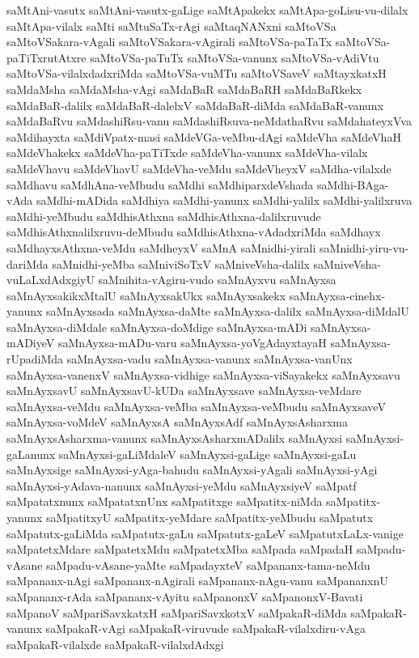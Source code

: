 {saMtAni-vasutx
saMtAni-vasutx-gaLige
saMtApakekx
saMtApa-goLisu-vu-dilalx
saMtApa-vilalx
saMti
saMtuSaTx-rAgi
saMtaqNANxni
saMtoVSa
saMtoVSakara-vAgali
saMtoVSakara-vAgirali
saMtoVSa-paTaTx
saMtoVSa-paTiTxrutAtxre
saMtoVSa-paTuTx
saMtoVSa-vanunx
saMtoVSa-vAdiVtu
saMtoVSa-vilalxdadxriMda
saMtoVSa-vuMTu
saMtoVSaveV
saMtayxkatxH
saMdaMsha
saMdaMsha-vAgi
saMdaBaR
saMdaBaRH
saMdaBaRkekx
saMdaBaR-dalilx
saMdaBaR-dalelxV
saMdaBaR-diMda
saMdaBaR-vanunx
saMdaBaRvu
saMdashiRsu-vanu
saMdashiRsuva-neMdathaRvu
saMdahateyxVva
saMdihayxta
saMdiVpatx-masi
saMdeVGa-veMbu-dAgi
saMdeVha
saMdeVhaH
saMdeVhakekx
saMdeVha-paTiTxde
saMdeVha-vanunx
saMdeVha-vilalx
saMdeVhavu
saMdeVhavU
saMdeVha-veMdu
saMdeVheyxV
saMdha-vilalxde
saMdhavu
saMdhAna-veMbudu
saMdhi
saMdhiparxdeVshada
saMdhi-BAga-vAda
saMdhi-mADida
saMdhiya
saMdhi-yanunx
saMdhi-yalilx
saMdhi-yalilxruva
saMdhi-yeMbudu
saMdhisAthxna
saMdhisAthxna-dalilxruvude
saMdhisAthxnalilxruvu-deMbudu
saMdhisAthxna-vAdadxriMda
saMdhayx
saMdhayxsAthxna-veMdu
saMdheyxV
saMnA
saMnidhi-yirali
saMnidhi-yiru-vu-dariMda
saMnidhi-yeMba
saMniviSoTxV
saMniveVsha-dalilx
saMniveVsha-vuLaLxdAdxgiyU
saMnihita-vAgiru-vudo
saMnAyxvu
saMnAyxsa
saMnAyxsakikxMtalU
saMnAyxsakUkx
saMnAyxsakekx
saMnAyxsa-cinehx-yanunx
saMnAyxsada
saMnAyxsa-daMte
saMnAyxsa-dalilx
saMnAyxsa-diMdalU
saMnAyxsa-diMdale
saMnAyxsa-doMdige
saMnAyxsa-mADi
saMnAyxsa-mADiyeV
saMnAyxsa-mADu-varu
saMnAyxsa-yoVgAdayxtayaH
saMnAyxsa-rUpadiMda
saMnAyxsa-vadu
saMnAyxsa-vanunx
saMnAyxsa-vanUnx
saMnAyxsa-vanenxV
saMnAyxsa-vidhige
saMnAyxsa-viSayakekx
saMnAyxsavu
saMnAyxsavU
saMnAyxsavU-kUDa
saMnAyxsave
saMnAyxsa-veMdare
saMnAyxsa-veMdu
saMnAyxsa-veMba
saMnAyxsa-veMbudu
saMnAyxsaveV
saMnAyxsa-voMdeV
saMnAyxsA
saMnAyxsAdf
saMnAyxsAsharxma
saMnAyxsAsharxma-vanunx
saMnAyxsAsharxmADalilx
saMnAyxsi
saMnAyxsi-gaLanunx
saMnAyxsi-gaLiMdaleV
saMnAyxsi-gaLige
saMnAyxsi-gaLu
saMnAyxsige
saMnAyxsi-yAga-bahudu
saMnAyxsi-yAgali
saMnAyxsi-yAgi
saMnAyxsi-yAdava-nanunx
saMnAyxsi-yeMdu
saMnAyxsiyeV
saMpatf
saMpatatxnunx
saMpatatxnUnx
saMpatitxge
saMpatitx-niMda
saMpatitx-yanunx
saMpatitxyU
saMpatitx-yeMdare
saMpatitx-yeMbudu
saMpatutx
saMpatutx-gaLiMda
saMpatutx-gaLu
saMpatutx-gaLeV
saMpatutxLaLx-vanige
saMpatetxMdare
saMpatetxMdu
saMpatetxMba
saMpada
saMpadaH
saMpadu-vAsane
saMpadu-vAsane-yaMte
saMpadayxteV
saMpananx-tama-neMdu
saMpananx-nAgi
saMpananx-nAgirali
saMpananx-nAgu-vanu
saMpananxnU
saMpananx-rAda
saMpananx-vAyitu
saMpanonxV
saMpanonxV-Bavati
saMpanoV
saMpariSavxkatxH
saMpariSavxkotxV
saMpakaR-diMda
saMpakaR-vanunx
saMpakaR-vAgi
saMpakaR-viruvude
saMpakaR-vilalxdiru-vAga
saMpakaR-vilalxde
saMpakaR-vilalxdAdxgi
}
